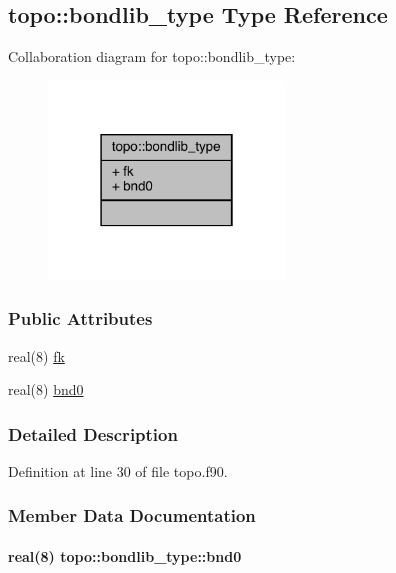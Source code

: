 \hypertarget{structtopo_1_1bondlib__type}{\subsection{topo\-:\-:bondlib\-\_\-type Type Reference}
\label{structtopo_1_1bondlib__type}
}


Collaboration diagram for topo\-:\-:bondlib\-\_\-type\-:
\nopagebreak
\begin{figure}[H]
\begin{center}
\leavevmode
\includegraphics[width=178pt]{structtopo_1_1bondlib__type__coll__graph}
\end{center}
\end{figure}
\subsubsection*{Public Attributes}
\begin{DoxyCompactItemize}
\item 
real(8) \hyperlink{structtopo_1_1bondlib__type_ae7ba2d46169647c37374c277c8c8cdc0}{fk}
\item 
real(8) \hyperlink{structtopo_1_1bondlib__type_a12dcf2cd8140289546fdf1f70f7adcef}{bnd0}
\end{DoxyCompactItemize}


\subsubsection{Detailed Description}


Definition at line 30 of file topo.\-f90.



\subsubsection{Member Data Documentation}
\hypertarget{structtopo_1_1bondlib__type_a12dcf2cd8140289546fdf1f70f7adcef}{
\paragraph[{bnd0}]{\setlength{\rightskip}{0pt plus 5cm}real(8) topo\-::bondlib\-\_\-type\-::bnd0}}\label{structtopo_1_1bondlib__type_a12dcf2cd8140289546fdf1f70f7adcef}


